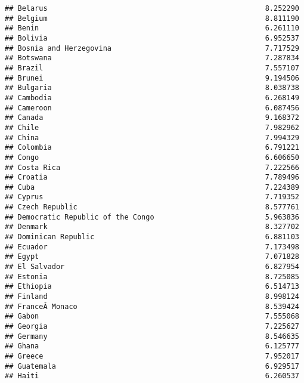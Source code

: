 \documentclass[
]{article}
\begin{document}
\begin{verbatim}
## Belarus                                                   8.252290
## Belgium                                                   8.811190
## Benin                                                     6.261110
## Bolivia                                                   6.952537
## Bosnia and Herzegovina                                    7.717529
## Botswana                                                  7.287834
## Brazil                                                    7.557107
## Brunei                                                    9.194506
## Bulgaria                                                  8.038738
## Cambodia                                                  6.268149
## Cameroon                                                  6.087456
## Canada                                                    9.168372
## Chile                                                     7.982962
## China                                                     7.994329
## Colombia                                                  6.791221
## Congo                                                     6.606650
## Costa Rica                                                7.222566
## Croatia                                                   7.789496
## Cuba                                                      7.224389
## Cyprus                                                    7.719352
## Czech Republic                                            8.577761
## Democratic Republic of the Congo                          5.963836
## Denmark                                                   8.327702
## Dominican Republic                                        6.881103
## Ecuador                                                   7.173498
## Egypt                                                     7.071828
## El Salvador                                               6.827954
## Estonia                                                   8.725085
## Ethiopia                                                  6.514713
## Finland                                                   8.998124
## FranceÂ Monaco                                            8.539424
## Gabon                                                     7.555068
## Georgia                                                   7.225627
## Germany                                                   8.546635
## Ghana                                                     6.125777
## Greece                                                    7.952017
## Guatemala                                                 6.929517
## Haiti                                                     6.260537

\end{verbatim}
\end{document}
